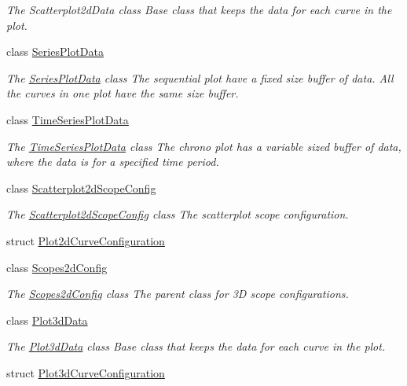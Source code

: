 \begin{DoxyCompactItemize}
\begin{DoxyCompactList}\small\item\em The Scatterplot2d\-Data class Base class that keeps the data for each curve in the plot. \end{DoxyCompactList}\item 
class \hyperlink{class_series_plot_data}{Series\-Plot\-Data}
\begin{DoxyCompactList}\small\item\em The \hyperlink{class_series_plot_data}{Series\-Plot\-Data} class The sequential plot have a fixed size buffer of data. All the curves in one plot have the same size buffer. \end{DoxyCompactList}\item 
class \hyperlink{class_time_series_plot_data}{Time\-Series\-Plot\-Data}
\begin{DoxyCompactList}\small\item\em The \hyperlink{class_time_series_plot_data}{Time\-Series\-Plot\-Data} class The chrono plot has a variable sized buffer of data, where the data is for a specified time period. \end{DoxyCompactList}\item 
class \hyperlink{class_scatterplot2d_scope_config}{Scatterplot2d\-Scope\-Config}
\begin{DoxyCompactList}\small\item\em The \hyperlink{class_scatterplot2d_scope_config}{Scatterplot2d\-Scope\-Config} class The scatterplot scope configuration. \end{DoxyCompactList}\item 
struct \hyperlink{struct_plot2d_curve_configuration}{Plot2d\-Curve\-Configuration}
\item 
class \hyperlink{class_scopes2d_config}{Scopes2d\-Config}
\begin{DoxyCompactList}\small\item\em The \hyperlink{class_scopes2d_config}{Scopes2d\-Config} class The parent class for 3\-D scope configurations. \end{DoxyCompactList}\item 
class \hyperlink{class_plot3d_data}{Plot3d\-Data}
\begin{DoxyCompactList}\small\item\em The \hyperlink{class_plot3d_data}{Plot3d\-Data} class Base class that keeps the data for each curve in the plot. \end{DoxyCompactList}\item 
struct \hyperlink{struct_plot3d_curve_configuration}{Plot3d\-Curve\-Configuration}

\end{DoxyCompactItemize}
